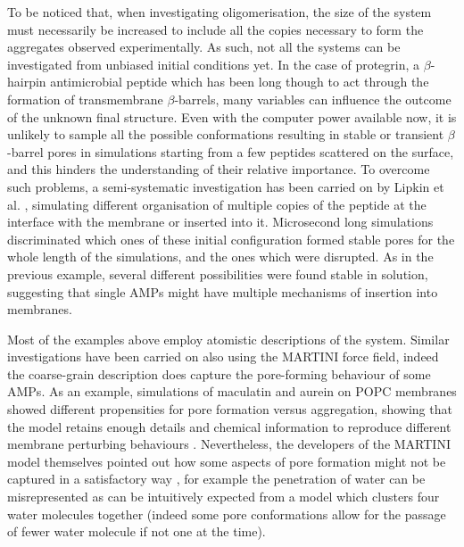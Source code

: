 To be noticed that, when investigating oligomerisation, the size of the system must necessarily be increased to include all the copies necessary to form the aggregates observed experimentally. As such, not all the systems can be investigated from unbiased initial conditions yet.
%
In the case of protegrin, a $\beta$-hairpin antimicrobial peptide which has been long though to act through the formation of transmembrane $\beta$-barrels, many variables can influence the outcome of the unknown final structure.
%
Even with the computer power available now, it is unlikely to sample all the possible conformations resulting in stable or transient $\beta$-barrel pores in simulations starting from a few peptides scattered on the surface, and this hinders the understanding of their relative importance.
%
To overcome such problems, a semi-systematic investigation has been carried on by Lipkin et al. \cite{Lipkin2017}, simulating different organisation of multiple copies of the peptide at the interface with the membrane or inserted into it.
%
Microsecond long simulations discriminated which ones of these initial configuration formed stable pores for the whole length of the simulations, and the ones which were disrupted. As in the previous example, several different possibilities were found stable in solution, suggesting that single AMPs might have multiple mechanisms of insertion into membranes.

Most of the examples above employ atomistic descriptions of the system. Similar investigations have been carried on also using the MARTINI force field, indeed the coarse-grain description does capture the pore-forming behaviour of some AMPs.
%
As an example, simulations of maculatin and aurein on POPC membranes showed different propensities for pore formation versus aggregation, showing that the model retains enough details and chemical information to reproduce different membrane perturbing behaviours \cite{Balatti2017}.
%
Nevertheless, the developers of the MARTINI model themselves pointed out how some aspects of pore formation might not be captured in a satisfactory way \cite{Marrink2013}, for example the penetration of water can be misrepresented as can be intuitively expected from a model which clusters four water molecules together (indeed some pore conformations allow for the passage of fewer water molecule if not one at the time).

